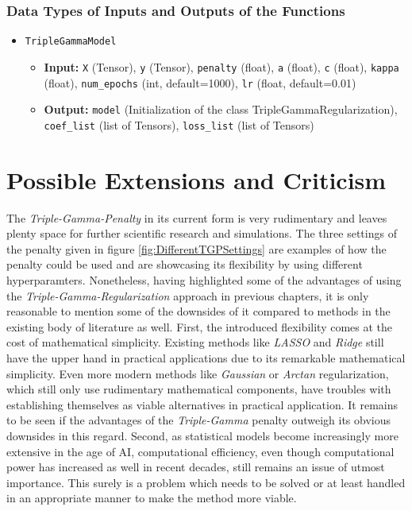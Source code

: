 \documentclass[12pt,a4paper]{article}
\begin{document}
\subsubsection*{Data Types of Inputs and Outputs of the Functions}
\begin{itemize}
  	\item \texttt{TripleGammaModel}
    \begin{itemize}
        \item \textbf{Input:} \texttt{X} (Tensor), \texttt{y} (Tensor), \texttt{penalty} (float), \texttt{a} (float), \texttt{c} (float), \texttt{kappa} (float), \texttt{num\_epochs} (int, default=1000), \texttt{lr} (float, default=0.01)
        \item \textbf{Output:} \texttt{model} (Initialization of the class TripleGammaRegularization), \texttt{coef\_list} (list of Tensors), \texttt{loss\_list} (list of Tensors)
    \end{itemize}
\end{itemize}

\section{Possible Extensions and Criticism}\label{sec:crit}
The \textit{Triple-Gamma-Penalty} in its current form is very rudimentary and leaves plenty space for further scientific research and simulations. The three settings of the penalty given in figure \ref{fig:DifferentTGPSettings} are examples of how the penalty could be used and are showcasing its flexibility by using different hyperparamters. Nonetheless, having highlighted some of the advantages of using the \textit{Triple-Gamma-Regularization} approach in previous chapters, it is only reasonable to mention some of the downsides of it compared to methods in the existing body of literature as well. First, the introduced flexibility comes at the cost of mathematical simplicity. Existing methods like \textit{LASSO} and \textit{Ridge} still have the upper hand in practical applications due to its remarkable mathematical simplicity. Even more modern methods like \textit{Gaussian} or \textit{Arctan} regularization, which still only use rudimentary mathematical components, have troubles with establishing themselves as viable alternatives in practical application. It remains to be seen if the advantages of the \textit{Triple-Gamma} penalty outweigh its obvious downsides in this regard. Second, as statistical models become increasingly more extensive in the age of AI, computational efficiency, even though computational power has increased as well in recent decades, still remains an issue of utmost importance. This surely is a problem which needs to be solved or at least handled in an appropriate manner to make the method more viable.\\
\end{document}
